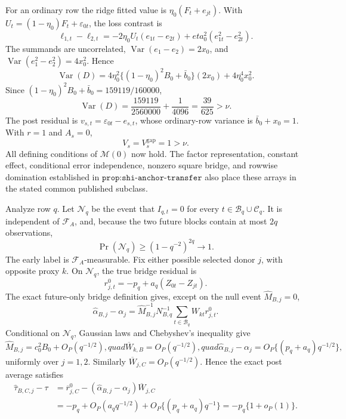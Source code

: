 For an ordinary row the ridge fitted value is \(\eta_0(F_t+e_{jt})\).  With \(U_t=(1-\eta_0)F_t+\varepsilon_{0t}\), the loss contrast is
\[
 \ell_{1,t}-\ell_{2,t}
 =-2\eta_0U_t(e_{1t}-e_{2t})+eta_0^2(e_{1t}^2-e_{2t}^2).
\]
The summands are uncorrelated, \(\operatorname{Var}(e_1-e_2)=2x_0\), and \(\operatorname{Var}(e_1^2-e_2^2)=4x_0^2\).  Hence
\[
 \operatorname{Var}(D)
 =4\eta_0^2\{(1-\eta_0)^2B_0+\bar b_0\}(2x_0)
 +4\eta_0^4x_0^2.
\]
Since \((1-\eta_0)^2B_0+\bar b_0=159119/160000\),
\[
 \operatorname{Var}(D)=\frac{159119}{2560000}+\frac1{4096}
 =\frac{39}{625}>\nu.
\]
The post residual is \(v_{s,t}=\varepsilon_{0t}-e_{s,t}\), whose ordinary-row variance is \(\bar b_0+x_0=1\).  With \(r=1\) and \(A_s=0\),
\[
 V_s=V_s^{\mathrm{gap}}=1>\nu.
\]
All defining conditions of \(\mathcal M(0)\) now hold.  The factor representation, constant effect, conditional error independence, nonzero square bridge, and rowwise domination established in \(\texttt{prop:shi-anchor-transfer}\) also place these arrays in the stated common published subclass.

Analyze row \(q\).  Let \(\mathcal N_q\) be the event that \(I_{q,t}=0\) for every \(t\in\mathcal B_q\cup\mathcal C_q\).  It is independent of \(\mathcal F_A\), and, because the two future blocks contain at most \(2q\) observations,
\[
 \Pr(\mathcal N_q)\geq(1-q^{-2})^{2q}\to1.
\]
The early label is \(\mathcal F_A\)-measurable.  Fix either possible selected donor \(j\), with opposite proxy \(k\).  On \(\mathcal N_q\), the true bridge residual is
\[
 r_{j,t}^0=-p_q+a_q(Z_{0t}-Z_{jt}).
\]
The exact future-only bridge definition gives, except on the null event \(\widehat M_{B,j}=0\),
\[
 \widehat\alpha_{B,j}-\alpha_j
 =\widehat M_{B,j}^{-1}N_{B,q}^{-1}
  \sum_{t\in\mathcal B_q}W_{kt}r_{j,t}^0.
\]
Conditional on \(\mathcal N_q\), Gaussian laws and Chebyshev's inequality give
\[
 \widehat M_{B,j}=c_0^2B_0+O_P(q^{-1/2}),quad
 \overline W_{k,B}=O_P(q^{-1/2}),quad
 \widehat\alpha_{B,j}-\alpha_j
 =O_P\{(p_q+a_q)q^{-1/2}\},
\]
uniformly over \(j=1,2\).  Similarly \(\overline W_{j,C}=O_P(q^{-1/2})\).  Hence the exact post average satisfies
\[
 \begin{aligned}
 \widehat\tau_{B,C,j}-\tau
 &=\overline r_{j,C}^0-(\widehat\alpha_{B,j}-\alpha_j)\overline W_{j,C}\\
 &=-p_q+O_P(a_qq^{-1/2})+O_P\{(p_q+a_q)q^{-1}\}
 =-p_q\{1+o_P(1)\}.
 \end{aligned}
\]

